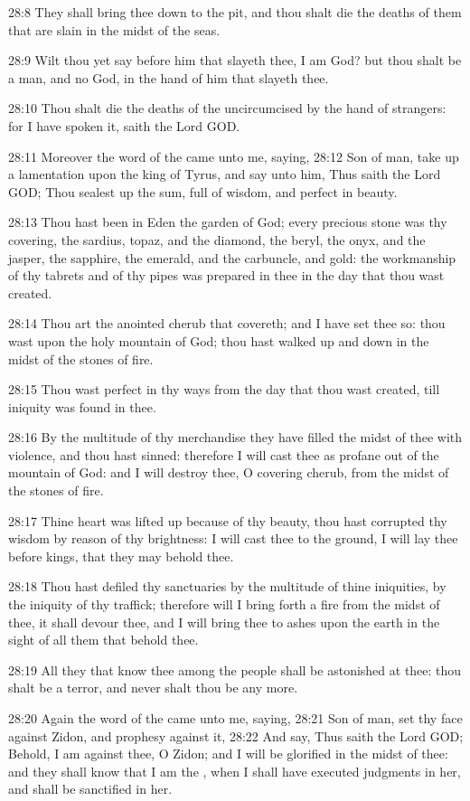 28:8 They shall bring thee down to the pit, and thou shalt die the deaths of them that are slain in the midst of the seas.

28:9 Wilt thou yet say before him that slayeth thee, I am God? but thou shalt be a man, and no God, in the hand of him that slayeth thee.

28:10 Thou shalt die the deaths of the uncircumcised by the hand of strangers: for I have spoken it, saith the Lord GOD.

28:11 Moreover the word of the \LORD came unto me, saying, 28:12 Son of man, take up a lamentation upon the king of Tyrus, and say unto him, Thus saith the Lord GOD; Thou sealest up the sum, full of wisdom, and perfect in beauty.

28:13 Thou hast been in Eden the garden of God; every precious stone was thy covering, the sardius, topaz, and the diamond, the beryl, the onyx, and the jasper, the sapphire, the emerald, and the carbuncle, and gold: the workmanship of thy tabrets and of thy pipes was prepared in thee in the day that thou wast created.

28:14 Thou art the anointed cherub that covereth; and I have set thee so: thou wast upon the holy mountain of God; thou hast walked up and down in the midst of the stones of fire.

28:15 Thou wast perfect in thy ways from the day that thou wast created, till iniquity was found in thee.

28:16 By the multitude of thy merchandise they have filled the midst of thee with violence, and thou hast sinned: therefore I will cast thee as profane out of the mountain of God: and I will destroy thee, O covering cherub, from the midst of the stones of fire.

28:17 Thine heart was lifted up because of thy beauty, thou hast corrupted thy wisdom by reason of thy brightness: I will cast thee to the ground, I will lay thee before kings, that they may behold thee.

28:18 Thou hast defiled thy sanctuaries by the multitude of thine iniquities, by the iniquity of thy traffick; therefore will I bring forth a fire from the midst of thee, it shall devour thee, and I will bring thee to ashes upon the earth in the sight of all them that behold thee.

28:19 All they that know thee among the people shall be astonished at thee: thou shalt be a terror, and never shalt thou be any more.

28:20 Again the word of the \LORD came unto me, saying, 28:21 Son of man, set thy face against Zidon, and prophesy against it, 28:22 And say, Thus saith the Lord GOD; Behold, I am against thee, O Zidon; and I will be glorified in the midst of thee: and they shall know that I am the \LORD, when I shall have executed judgments in her, and shall be sanctified in her.

